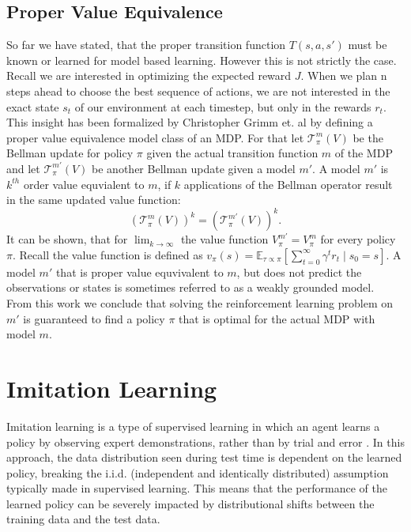 \subsection{Proper Value Equivalence}
So far we have stated, that the proper transition function $T(s,a,s')$ must be known or learned for model based learning. However this is not strictly the case. Recall we are 
interested in optimizing the expected reward $J$. When we plan n steps ahead to choose the best sequence of actions, we are not interested in the exact state $s_t$ 
of our environment at each timestep, but only in the rewards $r_t$. \\
This insight has been formalized by Christopher Grimm et. al \cite{grimm2021proper} by defining a proper value equivalence model class of an MDP. For that 
let $\mathcal{T}^m_{\pi}(V)$ be the Bellman update for policy $\pi$ given the actual transition function $m$ of the MDP and let 
$\mathcal{T}^{m'}_{\pi}(V)$ be another Bellman update given a model $m'$. A model $m'$ is $k^{th}$ order value equvialent to $m$, 
if $k$ applications of the Bellman operator result in the same updated value function: 
\begin{equation}
    \label{eq_kthVE}
    \left(\mathcal{T}^{m}_{\pi}(V)\right)^k = \left(\mathcal{T}^{m'}_{\pi}(V)\right)^k.
\end{equation}
It can be shown, that for $\lim_{k \rightarrow \infty}$ the value function $V_{\pi}^{m'} = V_{\pi}^m$ for every policy $\pi$. Recall the value function is 
defined as $v_{\pi}(s) = \mathbb{E}_{\tau \propto \pi}\left[\sum_{t=0}^{\infty} \gamma^t r_t \mid s_0 = s\right]$. A model $m'$ that is proper value 
equvivalent to $m$, but does not predict the observations or states is sometimes referred to as a weakly grounded model.\\ 
From this work we conclude that solving the 
reinforcement learning problem on $m'$ is guaranteed to find a policy $\pi$ that is optimal for the actual MDP with model $m$. 

\section{Imitation Learning}
Imitation learning is a type of supervised learning in which an agent learns a policy by observing expert demonstrations, 
rather than by trial and error \cite{IL}. In this approach, the data distribution seen during test time is dependent on the learned policy, 
breaking the i.i.d. (independent and identically distributed) assumption typically made in supervised learning. This means that the performance of the 
learned policy can be severely impacted by distributional shifts between the training data and the test data. \\ \\

